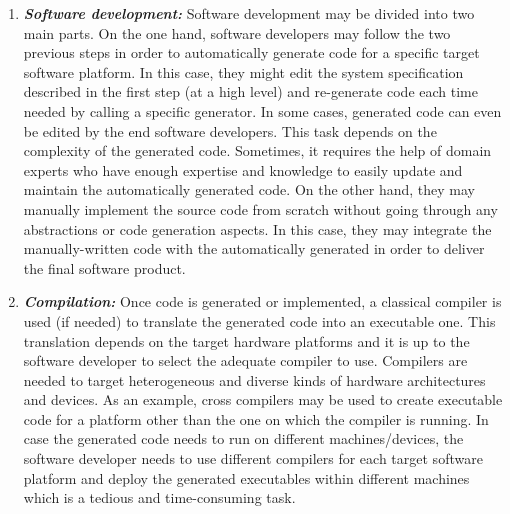 \begin{enumerate}
	
	
	\item \textbf{\textit{Software development:}}
	Software development may be divided into two main parts. On the one hand, software developers may follow the two previous steps in order to automatically generate code for a specific target software platform. In this case, they might edit the system specification described in the first step (at a high level) and re-generate code each time needed by calling a specific generator. In some cases, generated code can even be edited by the end software developers. This task depends on the complexity of the generated code. Sometimes, it requires the help of domain experts who have enough expertise and knowledge to easily update and maintain the automatically generated code. On the other hand, they may manually implement the source code from scratch without going through any abstractions or code generation aspects. In this case, they may integrate the manually-written code with the automatically generated in order to deliver the final software product.
	
	\item \textbf{\textit{Compilation:}}
	Once code is generated or implemented, a classical compiler is used (if needed) to translate the generated code into an executable one. This translation depends on the target hardware platforms and it is up to the software developer to select the adequate compiler to use. Compilers are needed to target heterogeneous and diverse kinds of hardware architectures and devices. 
	As an example, cross compilers may be used to create executable code for a platform other than the one on which the compiler is running. In case the generated code needs to run on different machines/devices, the software developer needs to use different compilers for each target software platform and deploy the generated executables within different machines which is a tedious and time-consuming task.
	
\end{enumerate} 


